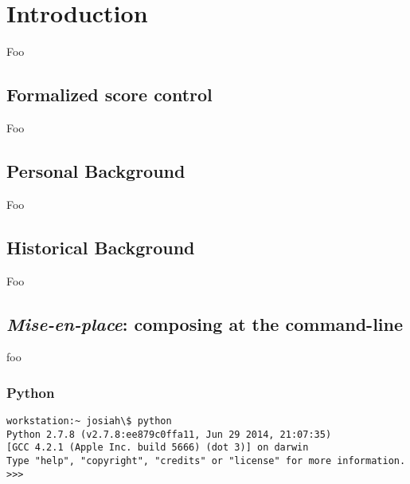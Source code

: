 \chapter{Introduction}

Foo

\section{Formalized score control}

Foo

\section{Personal Background}

Foo

\section{Historical Background}

Foo

\section{\emph{Mise-en-place}: composing at the command-line}

foo

\subsection{Python}

\begin{singlespacing}
\vspace{-0.5\baselineskip}
\begin{lstlisting}
workstation:~ josiah\$ python
Python 2.7.8 (v2.7.8:ee879c0ffa11, Jun 29 2014, 21:07:35) 
[GCC 4.2.1 (Apple Inc. build 5666) (dot 3)] on darwin
Type "help", "copyright", "credits" or "license" for more information.
>>>
\end{lstlisting}
\end{singlespacing}

